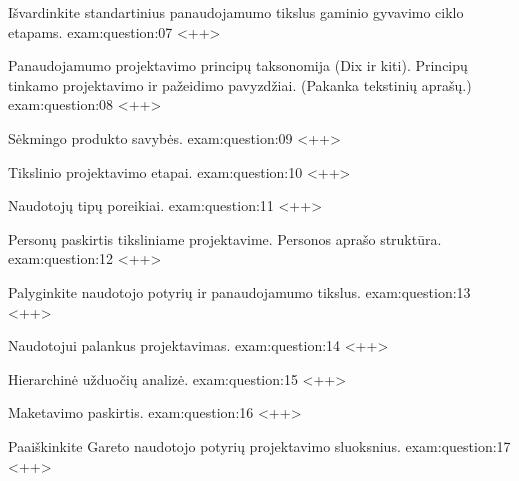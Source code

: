 \begin{question}{%
  Išvardinkite standartinius panaudojamumo tikslus gaminio gyvavimo ciklo
  etapams.
  }{exam:question:07}
  <++>
\end{question}

\begin{question}{%
  Panaudojamumo projektavimo principų taksonomija (Dix ir kiti).
  Principų tinkamo projektavimo ir pažeidimo pavyzdžiai. (Pakanka
  tekstinių aprašų.)
  }{exam:question:08}
  <++>
\end{question}

\begin{question}{%
  Sėkmingo produkto savybės.
  }{exam:question:09}
  <++>
\end{question}

\begin{question}{%
  Tikslinio projektavimo etapai.
  }{exam:question:10}
  <++>
\end{question}

\begin{question}{%
  Naudotojų tipų poreikiai.
  }{exam:question:11}
  <++>
\end{question}

\begin{question}{%
  Personų paskirtis tiksliniame projektavime. Personos aprašo struktūra.
  }{exam:question:12}
  <++>
\end{question}

\begin{question}{%
  Palyginkite naudotojo potyrių ir panaudojamumo tikslus.
  }{exam:question:13}
  <++>
\end{question}

\begin{question}{%
  Naudotojui palankus projektavimas.
  }{exam:question:14}
  <++>
\end{question}

\begin{question}{%
  Hierarchinė užduočių analizė.
  }{exam:question:15}
  <++>
\end{question}

\begin{question}{%
  Maketavimo paskirtis.
  }{exam:question:16}
  <++>
\end{question}

\begin{question}{%
  Paaiškinkite Gareto naudotojo potyrių projektavimo sluoksnius.
  }{exam:question:17}
  <++>
\end{question}

